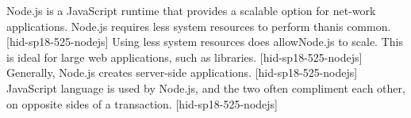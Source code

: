 Node.js is a JavaScript runtime that provides a scalable 
option for net-work applications. Node.js requires less 
system resources to perform thanis common. 
[hid-sp18-525-nodejs] Using less system resources does 
allowNode.js to scale. This is ideal for large web 
applications, such as libraries. [hid-sp18-525-nodejs] 
Generally, Node.js creates server-side applications. 
[hid-sp18-525-nodejs] JavaScript language is used by 
Node.js, and the two often compliment each
other, on opposite sides of a transaction. 
[hid-sp18-525-nodejs]
